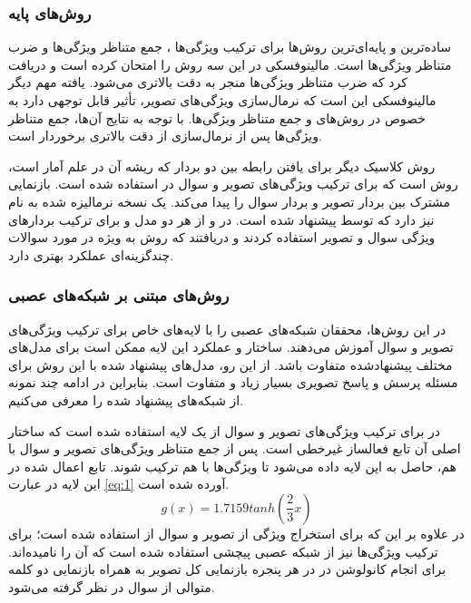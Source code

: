 \subsubsection{ روش‌های پایه}

ساده‌ترین و پایه‌ای‌ترین روش‌ها برای ترکیب ویژگی‌ها 
، جمع متناظر ویژگی‌ها
و ضرب متناظر ویژگی‌ها
 است. مالینوفسکی در
 \cite{malinowski2017ask}
 این سه روش را امتحان کرده است و دریافت کرد که  ضرب متناظر ویژگی‌ها منجر به دقت بالاتری‌ می‌شود. یافته مهم دیگر مالینوفسکی این است که نرمال‌سازی
  ویژگی‌های تصویر، تأثیر قابل توجهی دارد به خصوص در روش‌های
  و جمع متناظر ویژگی‌ها. با توجه به نتایج آن‌ها، جمع متناظر ویژگی‌ها پس از نرمال‌سازی از دقت بالاتری برخوردار است.
  
  روش کلاسیک دیگر برای یافتن رابطه بین دو بردار که ریشه آن در علم آمار است، روش 
   است که برای ترکیب ویژگی‌های تصویر و سوال در 
   استفاده شده است. 
    بازنمایی مشترک بین بردار تصویر و بردار سوال را پیدا می‌کند. 
     یک نسخه نرمالیزه شده به نام 
  نیز دارد که توسط 
  \cite{gong2014multi}
   پیشنهاد شده است. در 
   \cite{yu2015visual}
   و 
   \cite{tommasi2019combining}
   از هر دو مدل 
    و 
     برای ترکیب بردارهای ویژگی سوال و تصویر استفاده کردند و دریافتند که روش 
     به ویژه در مورد سوالات چندگزینه‌ای عملکرد بهتری دارد.
     
\subsubsection{ روش‌های مبتنی بر شبکه‌های عصبی}
در این روش‌ها، محققان شبکه‌های عصبی را با لایه‌های خاص برای ترکیب ویژگی‌های تصویر و سوال آموزش می‌دهند. ساختار و عملکرد این لایه ممکن است برای مدل‌های مختلف پیشنهادشده متفاوت باشد. از این رو، مدل‌های پیشنهاد شده با این روش برای مسئله پرسش و پاسخ تصویری بسیار زیاد  و متفاوت است. بنابراین در ادامه چند نمونه از شبکه‌های پیشنهاد شده را معرفی می‌کنیم.

در 
\cite{gao2015you}
برای ترکیب ویژگی‌های تصویر و سوال از یک لایه استفاده شده است که ساختار اصلی آن تابع فعالساز غیرخطی 
است. پس از جمع متناظر ویژگی‌های تصویر و سوال با هم، حاصل به این لایه داده می‌شود تا ویژگی‌ها با هم ترکیب شوند. تابع اعمال شده در این لایه در عبارت 
\ref{eq:1}
آورده شده است.
\begin{equation}\label{eq:1}
 g(x)=1.7159tanh(\frac{2}{3}x)
\end{equation}
در 
\cite{Ma2016LearningTA}
علاوه بر این که برای استخراج ویژگی از تصویر و سوال از 
استفاده شده است؛ برای ترکیب ویژگی‌ها نیز از شبکه عصبی پیچشی استفاده شده است که آن را
نامیده‌اند. برای انجام کانولوشن در 
در هر پنجره بازنمایی کل تصویر به همراه بازنمایی دو کلمه متوالی از سوال در نظر گرفته می‌شود. 

